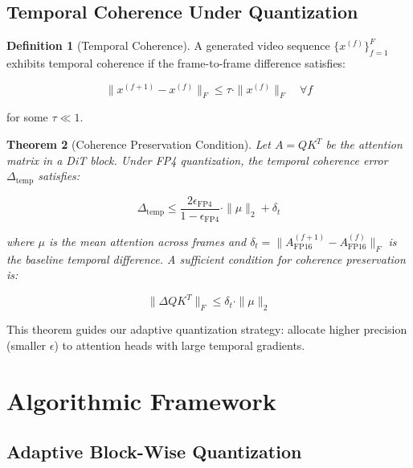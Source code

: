 \documentclass[journal,twoside]{IEEEtran}
\newtheorem{theorem}{Theorem}[section]
\theoremstyle{definition}
\newtheorem{definition}[theorem]{Definition}
\theoremstyle{remark}
\begin{document}
\subsection{Temporal Coherence Under Quantization}

\begin{definition}[Temporal Coherence]
A generated video sequence $\{x^{(f)}\}_{f=1}^F$ exhibits temporal coherence if the frame-to-frame difference satisfies:

\begin{equation}
\|x^{(f+1)} - x^{(f)}\|_F \leq \tau \cdot \|x^{(f)}\|_F \quad \forall f
\end{equation}

for some $\tau \ll 1$.
\end{definition}

\begin{theorem}[Coherence Preservation Condition]
Let $A = QK^T$ be the attention matrix in a DiT block. Under FP4 quantization, the temporal coherence error $\Delta_{\text{temp}}$ satisfies:

\begin{equation}
\Delta_{\text{temp}} \leq \frac{2\epsilon_{\text{FP4}}}{1 - \epsilon_{\text{FP4}}} \cdot \|\mu\|_2 + \delta_t
\end{equation}

where $\mu$ is the mean attention across frames and $\delta_t = \|A_{\text{FP16}}^{(f+1)} - A_{\text{FP16}}^{(f)}\|_F$ is the baseline temporal difference. A sufficient condition for coherence preservation is:

\begin{equation}
\|\Delta Q K^T\|_F \leq \delta_t \cdot \|\mu\|_2
\end{equation}
\end{theorem}

This theorem guides our adaptive quantization strategy: allocate higher precision (smaller $\epsilon$) to attention heads with large temporal gradients.

\section{Algorithmic Framework}
\label{sec:algorithm}

\subsection{Adaptive Block-Wise Quantization}
\end{document}

